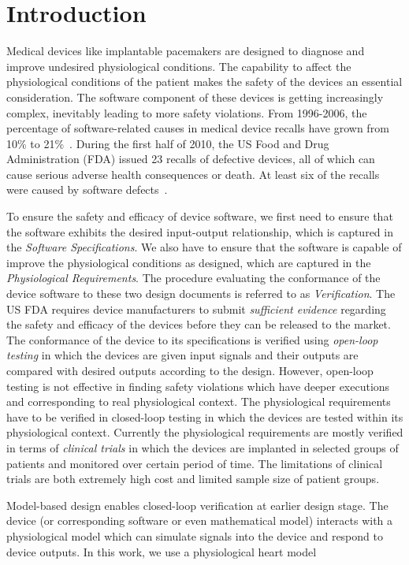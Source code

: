 \section{Introduction}
\label{introduction}

Medical devices like implantable pacemakers are designed to diagnose and improve undesired physiological conditions. The capability to affect the physiological conditions of the patient makes the safety of the devices an essential consideration. The software component of these devices is getting increasingly complex, inevitably leading to more safety violations. From 1996-2006, the percentage of software-related causes in medical device recalls have grown from 10\% to 21\%~\cite{recalls}. During the first half of 2010, the US Food and Drug Administration (FDA) issued 23 recalls of defective devices, all of which can cause serious adverse health consequences or death. At least six of the recalls were caused by software defects~\cite{killedbycode}. 

To ensure the safety and efficacy of device software, we first need to ensure that the software exhibits the desired input-output relationship, which is captured in the \emph{Software Specifications}. We also have to ensure that the software is capable of improve the physiological conditions as designed, which are captured in the \emph{Physiological Requirements}. The procedure evaluating the conformance of the device software to these two design documents is referred to as \emph{Verification}. The US FDA requires device manufacturers to submit \emph{sufficient evidence} regarding the safety and efficacy of the devices before they can be released to the market. The conformance of the device to its specifications is verified using \emph{open-loop testing} in which the devices are given input signals and their outputs are compared with desired outputs according to the design. However, open-loop testing is not effective in finding safety violations which have deeper executions and corresponding to real physiological context. The physiological requirements have to be verified in closed-loop testing in which the devices are tested within its physiological context. Currently the physiological requirements are mostly verified in terms of  \emph{clinical trials} in which the devices are implanted in selected groups of patients and monitored over certain period of time. The limitations of clinical trials are both extremely high cost and limited sample size of patient groups.

Model-based design enables closed-loop verification at earlier design stage. The device (or corresponding software or even mathematical model) interacts with a physiological model which can simulate signals into the device and respond to device outputs. In this work, we use a physiological heart model 

